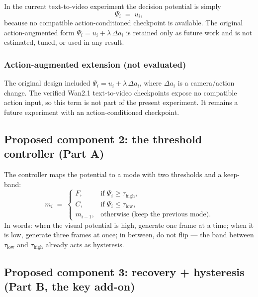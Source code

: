 \documentclass[11pt,a4paper]{article}
\begin{document}
In the current text-to-video experiment the decision potential is simply
\begin{equation}
\Psi_i \;=\; u_i,
\label{eq:psi}
\end{equation}
because no compatible action-conditioned checkpoint is available. The original action-augmented form $\Psi_i=u_i+\lambda\,\Delta a_i$ is retained only as future work and is not estimated, tuned, or used in any result.

\subsubsection{Action-augmented extension (not evaluated)}\label{sec:whycontrol}

The original design included $\Psi_i=u_i+\lambda\,\Delta a_i$, where $\Delta a_i$ is a camera/action change. The verified Wan2.1 text-to-video checkpoints expose no compatible action input, so this term is not part of the present experiment. It remains a future experiment with an action-conditioned checkpoint.
\subsection{Proposed component 2: the threshold controller (Part A)}

The controller maps the potential to a mode with two thresholds and a keep-band:
\begin{equation}
m_i \;=\;
\begin{cases}
F, & \text{if } \Psi_i \ge \tau_{\mathrm{high}},\\[2pt]
C, & \text{if } \Psi_i \le \tau_{\mathrm{low}},\\[2pt]
m_{i-1}, & \text{otherwise (keep the previous mode)}.
\end{cases}
\label{eq:threshold}
\end{equation}
In words: when the visual potential is high, generate one frame at a time; when it is low, generate three frames at once; in between, do not flip --- the band between $\tau_{\mathrm{low}}$ and $\tau_{\mathrm{high}}$ already acts as hysteresis.

\subsection{Proposed component 3: recovery + hysteresis (Part B, the key add-on)}
\end{document}
